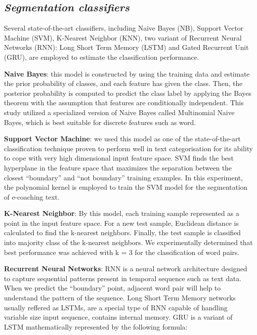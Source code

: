 \documentclass{amia}
\begin{document}
\subsection*{\textit{Segmentation classifiers}}
Several state-of-the-art classifiers, including Naive Bayes (NB)\cite{pedregosa2011scikit}, Support Vector Machine (SVM)\cite{chang2011libsvm}, K-Nearest Neighbor (KNN)\cite{pedregosa2011scikit}, two variant of Recurrent Neural Networks (RNN)\cite{bengio1993problem}: Long Short Term Memory (LSTM)\cite{hochreiter1997long} and Gated Recurrent Unit (GRU)\cite{cho2014properties}, are employed to estimate the classification performance. 

\textbf{Naive Bayes}: this model is constructed by using the training data and estimate the prior probability of classes, and each feature has given the class. Then, the posterior probability is computed to predict the class label by applying the Bayes theorem with the assumption that features are conditionally independent. This study utilized a specialized version of Naive Bayes called Multinomial Naive Bayes, which is best suitable for discrete features such as word.

\textbf{Support Vector Machine}: we used this model as one of the state-of-the-art classification technique proven to perform well in text categorisation\cite{joachims1998text} for its ability to cope with very high dimensional input feature space. SVM finds the best hyperplane in the feature space that maximizes the separation between the closest ``boundary'' and ``not boundary'' training examples. In this experiment, the polynomial kernel is employed to train the SVM model for the segmentation of e-coaching text.   

\textbf{K-Nearest Neighbor}: By this model, each training sample represented as a point in the input feature space. For a new test sample, Euclidean distance is calculated to find the k-nearest neighbors. Finally, the test sample is classified into majority class of the k-nearest neighbors. We experimentally determined that best performance was achieved with k = 3 for the classification of word pairs. 

\textbf{Recurrent Neural Networks}: RNN is a neural network architecture designed to capture sequential patterns present in temporal sequence such as text data. When we predict the ``boundary'' point, adjacent word pair will help to understand the pattern of the sequence. Long Short Term Memory networks usually reffered as LSTMs\cite{hochreiter1997long}, are a special type of RNN capable of handling variable size input sequence, contains internal memory. GRU\cite{cho2014properties} is a variant of LSTM mathematically represented by the following formula:
\end{document}
